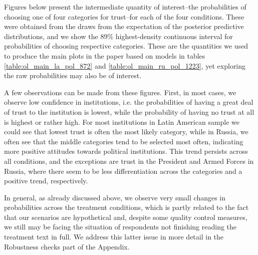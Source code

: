 \documentclass[11pt, ngerman,english,a4]{article}
\begin{document}


\clearpage






\newpage




\clearpage

Figures below present the intermediate quantity of interest--the probabilities of choosing one of four categories for trust--for each of the four conditions. These were obtained from the  draws from the expectation of the posterior predictive distributions, and we show the 89\% highest-density continuous interval for probabilities of choosing respective categories. These are the quantities we used to produce the main plots in the paper based on models in tables \ref{table:ol_main_la_pol_872} and \ref{table:ol_main_ru_pol_1223}, yet exploring the raw probabilities may also be of interest. 

A few observations can be made from these figures. First, in most cases, we observe low confidence in institutions, i.e. the probabilities of having a great deal of trust to the institution is lowest, while the probability of having no trust at all is highest or rather high. For most institutions in Latin American sample we could see that lowest trust is often the most likely category, while in Russia, we often see that the middle categories tend to be selected most often, indicating more positive attitudes towards political institutions. This trend persists across all conditions, and the exceptions are trust in the President and Armed Forces in Russia, where there seem to be less differentiation across the categories and a positive trend, respectively.

In general, as already discussed above, we observe very small changes in probabilities across the treatment conditions, which is partly related to the fact that our scenarios are hypothetical and, despite some quality control measures, we still may be facing the situation of respondents not finishing reading the treatment text in full. We address this latter issue in more detail in the Robustness checks part of the Appendix. 
\end{document}

